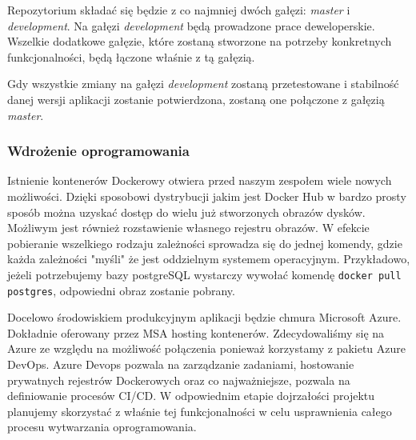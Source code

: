 \documentclass[10pt, titlepage, oneside, a4paper]{article}
\begin{document}
	Repozytorium składać się będzie z co najmniej dwóch gałęzi: \textit{master} i \textit{development}. Na gałęzi \textit{development} będą prowadzone prace deweloperskie. Wszelkie dodatkowe gałęzie, które zostaną stworzone na potrzeby konkretnych funkcjonalności, będą łączone właśnie z tą gałęzią.
	
	Gdy wszystkie zmiany na gałęzi \textit{development} zostaną przetestowane i stabilność danej wersji aplikacji zostanie potwierdzona, zostaną one połączone z gałęzią \textit{master}.
	  
	\subsubsection{Wdrożenie oprogramowania}
	Istnienie kontenerów Dockerowy otwiera przed naszym zespołem wiele nowych możliwości. Dzięki sposobowi dystrybucji jakim jest Docker Hub w bardzo prosty sposób można uzyskać dostęp do wielu już stworzonych obrazów dysków. Możliwym jest również rozstawienie własnego rejestru obrazów. W efekcie pobieranie wszelkiego rodzaju zależności sprowadza się do jednej komendy, gdzie każda zależności "myśli" że jest oddzielnym systemem operacyjnym. Przykładowo, jeżeli potrzebujemy bazy postgreSQL wystarczy wywołać komendę \texttt{docker pull postgres}, odpowiedni obraz zostanie pobrany.
	
	Docelowo środowiskiem produkcyjnym aplikacji będzie chmura Microsoft Azure. Dokładnie oferowany przez MSA hosting kontenerów. Zdecydowaliśmy się na Azure ze względu na możliwość połączenia ponieważ korzystamy z pakietu Azure DevOps. Azure Devops pozwala na zarządzanie zadaniami, hostowanie prywatnych rejestrów Dockerowych oraz co najważniejsze, pozwala na definiowanie procesów CI/CD. W odpowiednim etapie dojrzałości projektu planujemy skorzystać z właśnie tej funkcjonalności w celu usprawnienia całego procesu wytwarzania oprogramowania.
	  
\end{document}

